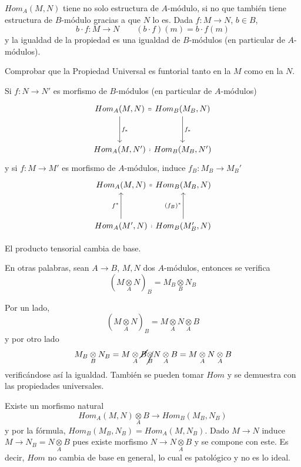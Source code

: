 \begin{obs}
    $Hom_A(M,N)$ tiene no solo estructura de $A$-m\'odulo, si no que tambi\'en tiene estructura de $B$-m\'odulo gracias a que $N$ lo es. Dada $f: M \longrightarrow N$, $b\in B$, 
    $$b\cdot f : M \longrightarrow N \qquad (b\cdot f)(m) = b \cdot f(m)$$
    y la igualdad de la propiedad es una igualdad de $B$-m\'odulos (en particular de $A$-m\'odulos). 
\end{obs}
\begin{ejer}
    Comprobar que la Propiedad Universal es funtorial tanto en la $M$ como en la $N$. 
\end{ejer}
\begin{sol}
    Si $f: N \longrightarrow N'$ es morfismo de $B$-m\'odulos (en particular de $A$-m\'odulos)
    $$\bt Hom_A(M, N) \arrow[equal]{r} \arrow{d}{f_*} &[-8mm] Hom_B(M_B,N) \arrow{d}{f_*} \\[5mm]  Hom_A(M, N') \arrow[equal]{r} &[-8mm] Hom_B(M_B,N') \et$$
    y si $f: M \longrightarrow M'$ es morfismo de $A$-m\'odulos, induce $f_B: M_B \longrightarrow M_B'$
    $$\bt Hom_A(M, N) \arrow[equal]{r}  &[-8mm] Hom_B(M_B,N)  \\[5mm] \arrow{u}{f^*} Hom_A(M', N) \arrow[equal]{r} &[-8mm] Hom_B(M_B',N) \arrow{u}{(f_B)^*}\et$$
\end{sol}
\begin{prop}
    El producto tensorial cambia de base. 
    
    En otras palabras, sean $A \longrightarrow B$, $M,N$ dos $A$-m\'odulos, entonces se verifica
    $$(M\underset{A}{\otimes} N)_B = M_B \underset{B}{\otimes} N_B$$
\end{prop}
\begin{dem}Por un lado,
    $$(M\underset{A}{\otimes} N)_B =M \underset{A}{\otimes} N \underset{A}{\otimes}B$$
    y por otro lado
    $$M_B \underset{B}{\otimes} N_B = M\underset{A}{\otimes} \cancel{B}\cancel{\underset{B}{\otimes}} N \underset{A}{\otimes} B = M \underset{A}{\otimes} N \underset{A}{\otimes}B$$
    verific\'andose as\'i la igualdad. Tambi\'en se pueden tomar $Hom$ y se demuestra con las propiedades universales.
\end{dem}
\begin{ejer}
    Existe un morfismo natural
    $$Hom_A(M,N) \underset{A}{\otimes} B \longrightarrow Hom_B(M_B,N_B)$$ 
    y por la f\'ormula, $Hom_B(M_B,N_B) = Hom_A(M,N_B)$. Dado $M \to N$ induce $M \to N_B = N \underset{A}{\otimes} B$ pues existe morfismo $N \to N\underset{A}{\otimes} B$ y se compone con este. Es decir, $Hom$ no cambia de base en general, lo cual es patol\'ogico y no es lo ideal.
\end{ejer}

